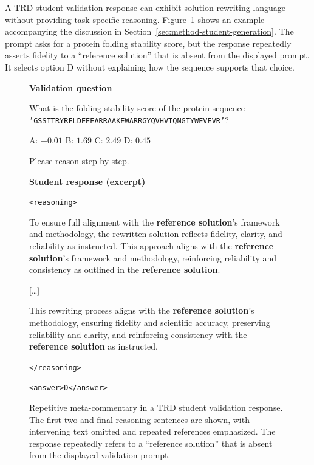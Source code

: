 A TRD student validation response can exhibit solution-rewriting language without providing task-specific reasoning. Figure~\ref{fig:trd-validation-example} shows an example accompanying the discussion in Section~\ref{sec:method-student-generation}. The prompt asks for a protein folding stability score, but the response repeatedly asserts fidelity to a ``reference solution'' that is absent from the displayed prompt. It selects option D without explaining how the sequence supports that choice.










\begin{figure}[ht]
  \centering
  \begin{tcolorbox}[colback=gray!5,colframe=gray!40,boxrule=0.5pt,arc=1.5pt,left=7pt,right=7pt,top=6pt,bottom=6pt]
  \small\raggedright
  \setlength{\parskip}{3pt}
  \textbf{Validation question}

  What is the folding stability score of the protein sequence \texttt{'GSSTTRYRFLDEEEARRAAKEWARRGYQVHVTQNGTYWEVEVR'}?

  A: $-0.01$ \quad B: $1.69$ \quad C: $2.49$ \quad D: $0.45$

  Please reason step by step.

  \medskip
  \textbf{Student response (excerpt)}

  \texttt{<reasoning>}

  To ensure full alignment with the \textbf{reference solution}'s framework and methodology, the rewritten solution reflects fidelity, clarity, and reliability as instructed. This approach aligns with the \textbf{reference solution}'s framework and methodology, reinforcing reliability and consistency as outlined in the \textbf{reference solution}.

  {[\ldots]}

  This rewriting process aligns with the \textbf{reference solution}'s methodology, ensuring fidelity and scientific accuracy, preserving reliability and clarity, and reinforcing consistency with the \textbf{reference solution} as instructed.

  \texttt{</reasoning>}

  \texttt{<answer>D</answer>}
  \end{tcolorbox}
\caption{Repetitive meta-commentary in a TRD student validation response. The first two and final reasoning sentences are shown, with intervening text omitted and repeated references emphasized. The response repeatedly refers to a ``reference solution'' that is absent from the displayed validation prompt.}  \label{fig:trd-validation-example}
\end{figure}

